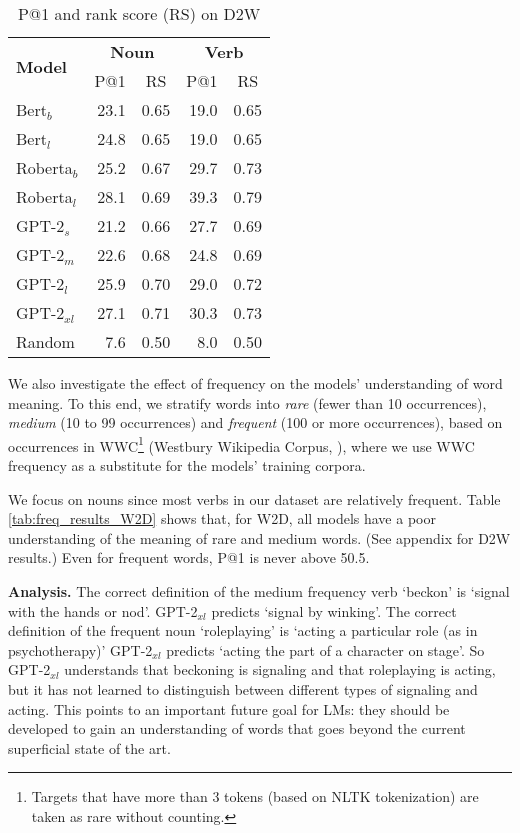 \documentclass[11pt,a4paper]{article}
\begin{document}
\begin{table}
    \centering
    \begin{tabular}{l|rrrr}
        \hline
         \multirow{2}{*}{\textbf{Model}} & \multicolumn{2}{c}{\textbf{Noun}} & \multicolumn{2}{c}{\textbf{Verb}} \\
         & \multicolumn{1}{c}{P@1} & \multicolumn{1}{c}{RS} & \multicolumn{1}{c}{P@1} & \multicolumn{1}{c}{RS} \\ \hline
     Bert$_{b}$ & 23.1 & 0.65 & 19.0 & 0.65 \\
     Bert$_{l}$ & 24.8 & 0.65 & 19.0 & 0.65 \\
     Roberta$_{b}$ & 25.2 & 0.67 & 29.7 & 0.73 \\
     Roberta$_{l}$ & 28.1 & 0.69 & 39.3 & 0.79 \\ \hline
     GPT-2$_{s}$ & 21.2 & 0.66 & 27.7 & 0.69 \\
     GPT-2$_{m}$ & 22.6 & 0.68 & 24.8 & 0.69 \\
     GPT-2$_{l}$ & 25.9 & 0.70 & 29.0 & 0.72 \\
     GPT-2$_{xl}$ & 27.1 & 0.71 & 30.3 & 0.73 \\ \hline 
     Random & 7.6 & 0.50 & 8.0 & 0.50 \\\hline
     
    \end{tabular}
    \caption{P@1 and rank score (RS) on D2W}
    \label{tab:results_D2W}
\end{table}


We also investigate the effect of frequency on the models' understanding of word meaning.
To this end, we stratify words into \textit{rare} (fewer
than 10 occurrences), \textit{medium} (10 to 99 occurrences)
and \textit{frequent} (100 or more occurrences), based on
occurrences in WWC\footnote{Targets that have more than 3
  tokens (based on NLTK tokenization) are taken as rare
  without counting.} (Westbury Wikipedia Corpus,
), where we use WWC frequency as a substitute
for the models' training
corpora. 

We focus on nouns since most verbs in our dataset are relatively frequent. 
Table \ref{tab:freq_results_W2D} shows that, for W2D, all models have a poor understanding of the meaning of rare and medium words. (See appendix for D2W results.) 
Even for frequent words, P@1 is never above 50.5.

\textbf{Analysis.}
The correct definition of the medium
frequency verb `beckon'
is 
`signal
with the hands or nod'.
GPT-2$_{xl}$ predicts 
`signal by winking'.
The correct definition of the
frequent noun `roleplaying' 
is `acting a particular role (as in psychotherapy)'
GPT-2$_{xl}$ predicts 
`acting the part of a
character on stage'.
So GPT-2$_{xl}$ 
understands that beckoning is signaling and that
roleplaying is acting, but 
it has not learned to distinguish between different types of
signaling and acting.
This points to an important future goal for
LMs: they should be developed to gain an understanding of
words that goes beyond the current superficial state of the art.
\end{document}
